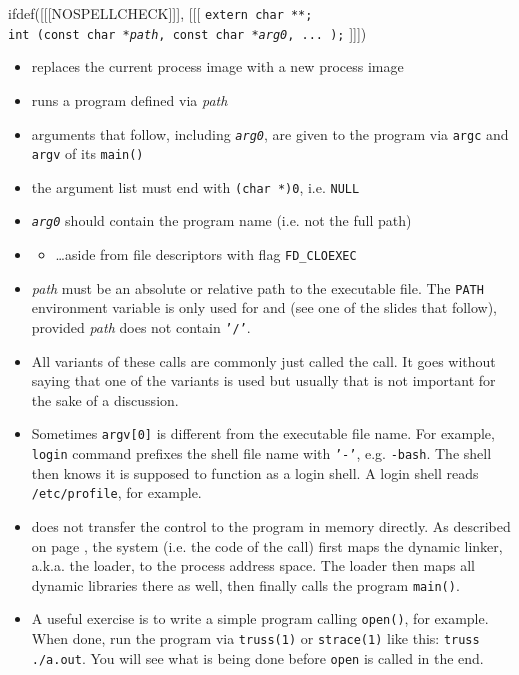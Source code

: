 \begin{slide}
ifdef([[[NOSPELLCHECK]]], [[[
\texttt{extern char **;\\
int (const char *\emph{path}, const char *\emph{arg0}, ... );}
]]])
\begin{itemize}
\item replaces the current process image with a new process image
\item runs a program defined via \emph{path}
\item arguments that follow, including \emph{\texttt{arg0}}, are given to the
program via \texttt{argc} and \texttt{argv} of its \texttt{main()}
\item the argument list must end with \texttt{(char *)0}, i.e. \texttt{NULL}
\item \emph{\texttt{arg0}} should contain the program name (i.e. not the full
path)
\item {}
\begin{itemize}
\item \dots{}aside from file descriptors with flag \texttt{FD\_CLOEXEC}
\end{itemize}
\end{itemize}
\end{slide}

\label{EXEC}

\begin{itemize}
\item \emph{path} must be an absolute or relative path to the executable file.
The \texttt{PATH} environment variable is only used for  and
 (see one of the slides that follow),
provided \emph{path} does not contain \texttt{'/'}.
\item All variants of these calls are commonly just called the 
call.  It goes without saying that one of the variants is used but usually that
is not important for the sake of a discussion.
\item Sometimes \texttt{argv[0]} is different from the executable file name.
For example, \texttt{login} command prefixes the shell file name with
\texttt{'-'}, e.g. \texttt{-bash}.  The shell then knows it is supposed to
function as a login shell.  A login shell reads \texttt{/etc/profile}, for
example.
\item {} does not transfer the control to the program in memory
directly. As described on page \pageref{RUNTIMELINKER}, the system (i.e. the
code of the  call) first maps the dynamic linker, a.k.a. the loader,
to the process address space.  The loader then maps all dynamic libraries there
as well, then finally calls the program \texttt{main()}.
\item A useful exercise is to write a simple program calling \texttt{open()},
for example.  When done, run the program via \texttt{truss(1)} or
\texttt{strace(1)} like this: \texttt{truss ./a.out}. You will see what is being
done before \texttt{open} is called in the end.
\end{itemize}

